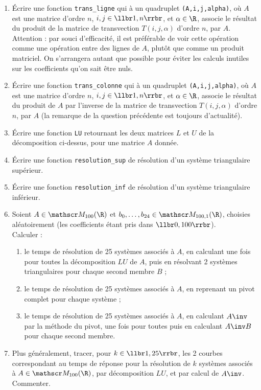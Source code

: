 \begin{enumerate}
\item Écrire une fonction \texttt{trans\_ligne} qui à un quadruplet \texttt{(A,i,j,alpha)}, où $A$ 
est une matrice d'ordre $n$, $i,j\in\llbr 1,n\rrbr$, et $\alpha\in\R$, associe le résultat du 
produit de la matrice de transvection $T(i,j,\alpha)$ d'ordre $n$, par $A$. Attention : par souci 
d'efficacité, il est préférable de voir cette opération comme une opération entre des lignes de 
$A$, 
plutôt que comme un produit matriciel. On s'arrangera autant que possible pour éviter les calculs 
inutiles sur les coefficients qu'on sait être nuls.
\item Écrire une fonction \texttt{trans\_colonne} qui à un quadruplet \texttt{(A,i,j,alpha)}, où 
$A$ est une matrice d'ordre $n$, $i,j\in\llbr 1,n\rrbr$, et $\alpha\in\R$, associe le résultat du 
produit de $A$ par l'inverse de la matrice de transvection $T(i,j,\alpha)$ d'ordre $n$, par $A$ (la 
remarque de la question précédente est toujours d'actualité).
\item Écrire une fonction \texttt{LU} retournant les deux matrices $L$ et $U$ de la décomposition 
ci-dessus, pour une matrice $A$ donnée.
\item Écrire une fonction \texttt{resolution\_sup} de résolution d'un système triangulaire 
supérieur.
\item Écrire une fonction \texttt{resolution\_inf} de résolution d'un système triangulaire 
inférieur.
\item Soient $A\in \mathscr M_{100}(\R)$ et $b_0,\ldots,b_{24}\in \mathscr M_{100,1}(\R)$, choisies 
aléatoirement (les coefficients étant pris dans $\llbr 0,100\rrbr$).\\
Calculer :\begin{enumerate}
\item le temps de résolution de 25 systèmes associés à $A$, en calculant une fois pour toutes la 
décomposition $LU$ de $A$, puis en résolvant 2 systèmes triangulaires pour chaque second membre $B$ 
;
\item le temps de résolution de 25 systèmes associés à $A$, en reprenant un pivot complet pour 
chaque système ;
\item le temps de résolution de 25 systèmes associés à $A$, en calculant $A\inv$ par la méthode du 
pivot, une fois pour toutes puis en calculant $A\inv B$ pour chaque second membre.
\end{enumerate}
\item Plus généralement, tracer, pour $k\in\llbr1, 25\rrbr$, les 2 courbes correspondant au temps 
de réponse pour la résolution de $k$ systèmes associés à $A\in \mathscr M_{100}(\R)$, par 
décomposition $LU$, et par calcul de $A\inv$. Commenter.

\end{enumerate}